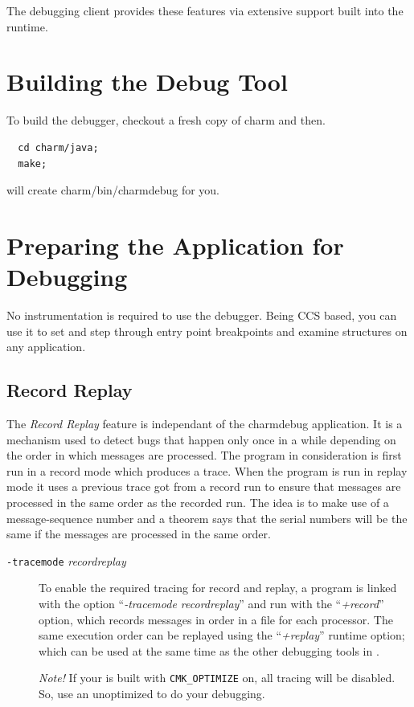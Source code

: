 \documentclass[10pt]{article}
\begin{document}
The debugging client provides these features via 
extensive support built into the \charmpp{} runtime.

\section{Building the \charmpp{} Debug Tool}

To build the debugger, checkout a fresh copy of charm and then.

\begin{verbatim}
  cd charm/java;
  make;
\end{verbatim}

will create charm/bin/charmdebug for you. 

\section{Preparing the \charmpp Application for Debugging}

No instrumentation is required to use the \charmpp{} debugger.  Being
CCS based, you can use it to set and step through entry point
breakpoints and examine \charmpp{} structures on any \charmpp{}
application.

\subsection{Record Replay}

The \textit{Record Replay} feature is independant of the charmdebug
application.  It is a mechanism used to detect bugs that happen only
once in a while depending on the order in which messages are
processed. The program in consideration is first run in a record mode
which produces a trace. When the program is run in replay mode it uses
a previous trace got from a record run to ensure that messages are
processed in the same order as the recorded run. The idea is to make
use of a message-sequence number and a theorem says that the serial
numbers will be the same if the messages are processed in the same
order. \cite{rashmithesis}

\begin{description}

\item[{\tt -tracemode} {\em recordreplay}]

To enable the required tracing for record and replay, a \charmpp{} 
program is linked with the option ``\textit{-tracemode recordreplay}''
and run with the ``\textit{+record}'' option, which records messages
in order in a file for each processor.  The same execution order can be 
replayed using the ``\textit{+replay}'' runtime option; which can be 
used at the same time as the other debugging tools in \charmpp{}.

\emph{ Note! } If your \charmpp{} is built with {\tt CMK\_OPTIMIZE} on, all tracing will be disabled.  So, use an unoptimized \charmpp{} to do your debugging.

\end{description}
\end{document}

